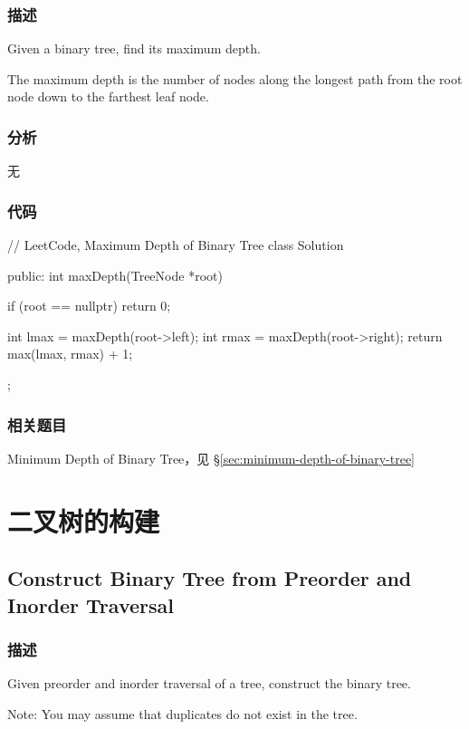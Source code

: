 \subsubsection{描述}
Given a binary tree, find its maximum depth.

The maximum depth is the number of nodes along the longest path from the root node down to the farthest leaf node.


\subsubsection{分析}
无

\subsubsection{代码}

\begin{Code}
// LeetCode, Maximum Depth of Binary Tree
class Solution {
public:
    int maxDepth(TreeNode *root) {
        if (root == nullptr) return 0;

        int lmax = maxDepth(root->left);
        int rmax = maxDepth(root->right);
        return max(lmax, rmax) + 1;
    }
};
\end{Code}


\subsubsection{相关题目}
\begindot
\item Minimum Depth of Binary Tree，见 \S \ref{sec:minimum-depth-of-binary-tree}
\myenddot


\section{二叉树的构建} %


\subsection{Construct Binary Tree from Preorder and Inorder Traversal}
\label{sec:construct-binary-tree-from-preorder-and-inorder-traversal}


\subsubsection{描述}
Given preorder and inorder traversal of a tree, construct the binary tree.

Note:
You may assume that duplicates do not exist in the tree.


